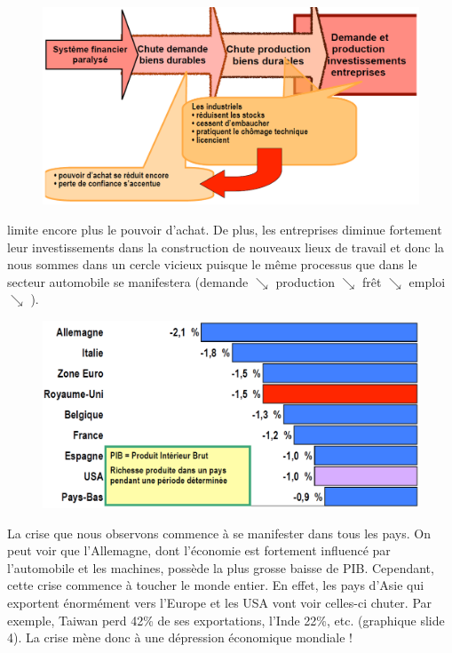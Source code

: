 \begin{figure}
\includegraphics[scale=0.3]{18}
\end{figure}
\noindent limite encore plus le pouvoir d'achat. De plus, les entreprises diminue fortement leur investissements dans la construction de nouveaux lieux de travail et donc la nous sommes dans un cercle vicieux puisque le même processus que dans le secteur automobile se manifestera (demande $\searrow$ production $\searrow$ frêt $\searrow$ emploi $\searrow$ ).
\\

\begin{figure}
\includegraphics[scale=0.3]{19}
\end{figure}
\noindent La crise que nous observons commence à se manifester dans tous les pays. On peut voir que l'Allemagne, dont l'économie est fortement influencé par l'automobile et les machines, possède la plus grosse baisse de PIB. Cependant, cette crise commence à toucher le monde entier. En effet, les pays d'Asie qui exportent énormément vers l'Europe et les USA vont voir celles-ci chuter. Par exemple, Taiwan perd 42\% de ses exportations, l'Inde 22\%, etc. (graphique slide 4). La crise mène donc à une dépression économique mondiale !
 
